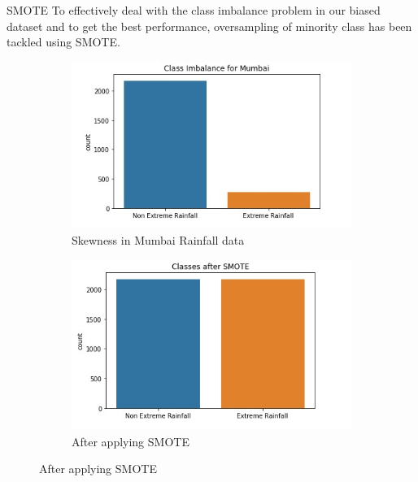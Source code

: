 \documentclass[11pt]{beamer}
\begin{document}
\begin{frame}{SMOTE}
To effectively deal with the class imbalance problem in our biased dataset and to get the best performance, oversampling of minority class has been tackled using SMOTE.

\begin{figure}[!h]
\begin{subfigure}{.5\textwidth}
\centering
\includegraphics[width=.8\linewidth]{Fig3.jpeg}
\caption{Skewness in Mumbai Rainfall data}
\end{subfigure}%
\begin{subfigure}{.5\textwidth}
\centering
\includegraphics[width=.8\linewidth]{fig4.jpeg}
\caption{After applying SMOTE}
\end{subfigure}
\end{figure}
\end{frame}
\end{document}

